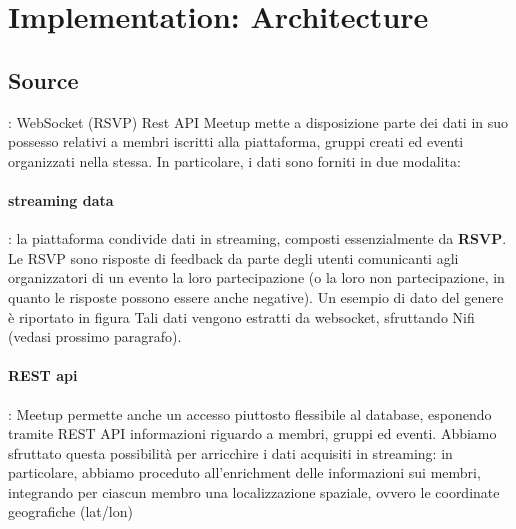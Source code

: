 \documentclass[fleqn,10pt]{SelfArx} %
\begin{document}
\section{Implementation: Architecture}
\subsection{Source}: WebSocket (RSVP) Rest API
Meetup mette a disposizione parte dei dati in suo possesso relativi a membri iscritti alla piattaforma, gruppi creati ed eventi organizzati nella stessa. In particolare, i dati sono forniti in due modalita: 

\paragraph{streaming data}: la piattaforma condivide dati in streaming, composti essenzialmente da \textbf{RSVP}.
Le RSVP sono risposte di feedback da parte degli utenti comunicanti agli organizzatori di un evento la loro partecipazione (o la loro non partecipazione, in quanto le risposte possono essere anche negative).
Un esempio di dato del genere è riportato in figura %
Tali dati vengono estratti da websocket, sfruttando Nifi (vedasi prossimo paragrafo).
\paragraph{REST api}: Meetup permette anche un accesso piuttosto flessibile al database, esponendo tramite REST API informazioni riguardo a membri, gruppi ed eventi. Abbiamo sfruttato questa possibilità per arricchire i dati acquisiti in streaming: in particolare, abbiamo proceduto all'enrichment delle informazioni sui membri, integrando per ciascun membro una localizzazione spaziale, ovvero le coordinate geografiche (lat/lon)
\end{document}
